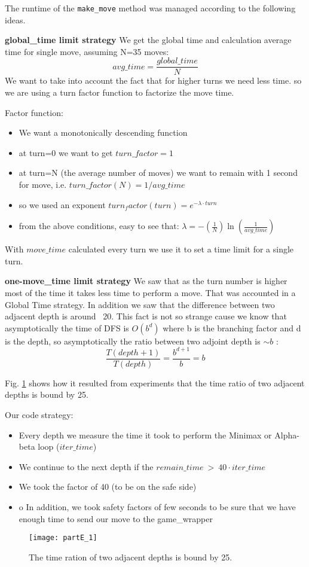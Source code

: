 \subsubsection{}\label{section_Ec}
The runtime of the \lstinline!make_move! method was managed according to the following ideas.

\textbf{global\_time limit strategy}
We get the global time and calculation average time for single move, assuming N=35 moves:
$$
avg\_time = \frac{global\_time}{N}
$$
We want to take into account the fact that for higher turns we need less time. so we are using a turn factor function to factorize the move time.

Factor function:
\begin{itemize}
    \item We want a monotonically descending function
    \item at turn=0 we want to get $turn\_factor=1$
    \item at turn=N (the average number of moves) we want to remain with 1 second for move, i.e. $turn\_factor(N)=1/avg\_time$
    \item so we used an exponent $turn_factor(turn)=e^{-\lambda\cdot turn}$
    \item from the above conditions, easy to see that: $\lambda=-(\frac{1}{N})\ln(\frac{1}{avg\_time})$
\end{itemize}
With $move\_time$ calculated every turn we use it to set a time limit for a single turn.

\textbf{one-move\_time limit strategy}
We saw that as the turn number is higher most of the time it takes less time to perform a move. That was accounted in a Global Time strategy. In addition we saw that the difference between two adjacent  depth is around ~20. This fact is not so strange cause we know that asymptotically the time of DFS is $O(b^d)$ where
b is the branching factor and d is the depth, so asymptotically the ratio between two adjoint depth is $\sim b$ :
$$
\frac{T(depth+1)}{T(depth)}=\frac{b^{d+1}}{b}=b
$$

Fig. \ref{fig:partE_1} shows how it resulted from experiments that the time ratio of two adjacent depths is bound by 25.

Our code strategy:
\begin{itemize}
    \item Every depth we measure the time it took to perform the Minimax or Alpha-beta loop ($iter\_time$)
    \item We continue to the next depth if the $remain\_time\ >\ 40\cdot iter\_time$
    \item We took the factor of 40 (to be on the safe side)
    \item o	In addition, we took safety factors of few seconds to be sure that we have enough time to send our move to the game\_wrapper
\end{itemize}

\begin{figure}[H]
    \centering
    \texttt{[image: partE\_1]}
    \caption{The time ration of two adjacent depths is bound by 25.}
    \label{fig:partE_1}
\end{figure}

